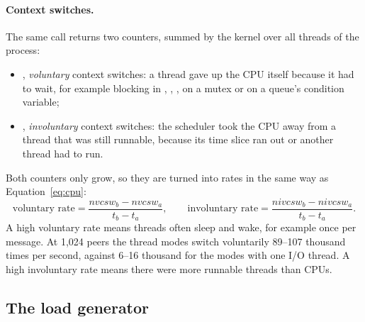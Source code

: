 \paragraph{Context switches.} The same  call returns
two counters, summed by the kernel over all threads of the process:
\begin{itemize}
  \item {}, \emph{voluntary} context switches: a thread gave up the CPU
        itself because it had to wait, for example blocking in ,
        , , on a mutex or on a queue's condition
        variable;
  \item {}, \emph{involuntary} context switches: the scheduler took
        the CPU away from a thread that was still runnable, because its time slice
        ran out or another thread had to run.
\end{itemize}
Both counters only grow, so they are turned into rates in the same way as
Equation~\ref{eq:cpu}:
\begin{equation}
\text{voluntary rate} = \frac{\mathit{nvcsw}_b - \mathit{nvcsw}_a}{t_b - t_a},
\qquad
\text{involuntary rate} = \frac{\mathit{nivcsw}_b - \mathit{nivcsw}_a}{t_b - t_a}.
\end{equation}
A high voluntary rate means threads often sleep and wake, for example once per
message. At 1,024 peers the thread modes switch voluntarily 89--107 thousand times
per second, against 6--16 thousand for the modes with one I/O thread. A high
involuntary rate means there were more runnable threads than CPUs.

\subsection{The load generator}
\label{sec:gen}

